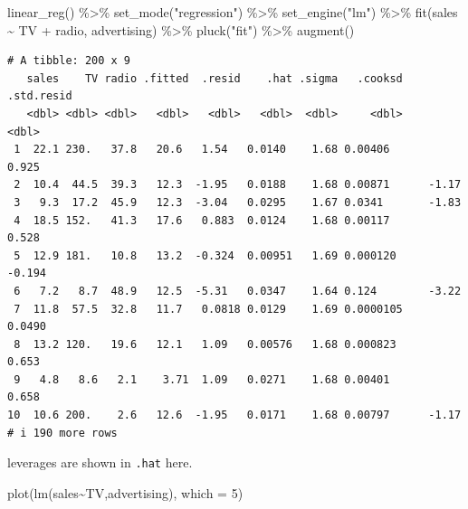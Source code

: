 \documentclass[
  letterpaper,
  DIV=11,
  numbers=noendperiod]{scrreprt}
\newenvironment{Shaded}{\begin{snugshade}}{\end{snugshade}}
\newcommand{\AttributeTok}[1]{\textcolor[rgb]{0.65,0.35,0.00}{#1}}
\newcommand{\DecValTok}[1]{\textcolor[rgb]{0.47,0.16,0.63}{#1}}
\newcommand{\FunctionTok}[1]{\textcolor[rgb]{0.02,0.16,0.49}{#1}}
\newcommand{\NormalTok}[1]{\textcolor[rgb]{0.33,0.33,0.33}{#1}}
\newcommand{\SpecialCharTok}[1]{\textcolor[rgb]{0.00,0.46,0.62}{#1}}
\newcommand{\StringTok}[1]{\textcolor[rgb]{0.00,0.50,0.00}{#1}}
\begin{document}
\begin{Shaded}
\begin{Highlighting}[]
\FunctionTok{linear\_reg}\NormalTok{() }\SpecialCharTok{\%\textgreater{}\%} 
  \FunctionTok{set\_mode}\NormalTok{(}\StringTok{"regression"}\NormalTok{) }\SpecialCharTok{\%\textgreater{}\%} 
  \FunctionTok{set\_engine}\NormalTok{(}\StringTok{"lm"}\NormalTok{) }\SpecialCharTok{\%\textgreater{}\%} 
  \FunctionTok{fit}\NormalTok{(sales }\SpecialCharTok{\textasciitilde{}}\NormalTok{ TV }\SpecialCharTok{+}\NormalTok{ radio, advertising) }\SpecialCharTok{\%\textgreater{}\%} 
  \FunctionTok{pluck}\NormalTok{(}\StringTok{"fit"}\NormalTok{) }\SpecialCharTok{\%\textgreater{}\%} 
  \FunctionTok{augment}\NormalTok{()}
\end{Highlighting}
\end{Shaded}

\begin{verbatim}
# A tibble: 200 x 9
   sales    TV radio .fitted  .resid    .hat .sigma   .cooksd .std.resid
   <dbl> <dbl> <dbl>   <dbl>   <dbl>   <dbl>  <dbl>     <dbl>      <dbl>
 1  22.1 230.   37.8   20.6   1.54   0.0140    1.68 0.00406       0.925 
 2  10.4  44.5  39.3   12.3  -1.95   0.0188    1.68 0.00871      -1.17  
 3   9.3  17.2  45.9   12.3  -3.04   0.0295    1.67 0.0341       -1.83  
 4  18.5 152.   41.3   17.6   0.883  0.0124    1.68 0.00117       0.528 
 5  12.9 181.   10.8   13.2  -0.324  0.00951   1.69 0.000120     -0.194 
 6   7.2   8.7  48.9   12.5  -5.31   0.0347    1.64 0.124        -3.22  
 7  11.8  57.5  32.8   11.7   0.0818 0.0129    1.69 0.0000105     0.0490
 8  13.2 120.   19.6   12.1   1.09   0.00576   1.68 0.000823      0.653 
 9   4.8   8.6   2.1    3.71  1.09   0.0271    1.68 0.00401       0.658 
10  10.6 200.    2.6   12.6  -1.95   0.0171    1.68 0.00797      -1.17  
# i 190 more rows
\end{verbatim}

leverages are shown in \texttt{.hat} here.

\begin{Shaded}
\begin{Highlighting}[]
\FunctionTok{plot}\NormalTok{(}\FunctionTok{lm}\NormalTok{(sales}\SpecialCharTok{\textasciitilde{}}\NormalTok{TV,advertising), }\AttributeTok{which =} \DecValTok{5}\NormalTok{)}
\end{Highlighting}
\end{Shaded}
\end{document}
